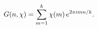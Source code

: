 \[\mathop{G\/}\nolimits\!\left(n,\mathop{\chi\/}\nolimits\right)=\sum_{m=1}^{k}%
\mathop{\chi\/}\nolimits\!\left(m\right)e^{2\pi imn/k}.\]